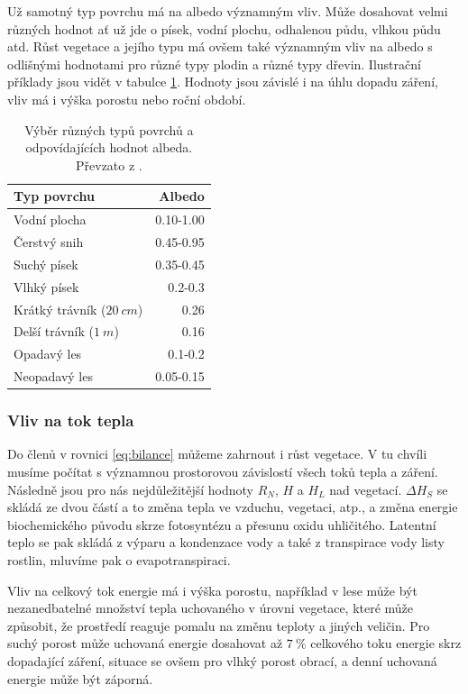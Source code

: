Už samotný typ povrchu má na albedo významným vliv. Může dosahovat velmi různých hodnot ať už jde o písek, vodní plochu, odhalenou půdu, vlhkou půdu atd. Růst vegetace a jejího typu má ovšem také významným vliv na albedo s odlišnými hodnotami pro různé typy plodin a různé typy dřevin. Ilustrační příklady jsou vidět v tabulce \ref{tab:albedo}. Hodnoty jsou závislé i na úhlu dopadu záření, vliv má i výška porostu nebo roční období\cite{arya2001,alma}.

\begin{table}
\centering\footnotesize\sf
\begin{tabular}{lr}
\toprule
Typ povrchu & Albedo \\
\midrule
Vodní plocha & 0.10-1.00 \\
Čerstvý snih & 0.45-0.95 \\
Suchý písek & 0.35-0.45\\
Vlhký písek & 0.2-0.3\\
Krátký trávník ($\SI{20}{cm}$) & 0.26\\
Delší trávník ($\SI{1}{m}$) & 0.16\\
Opadavý les & 0.1-0.2\\
Neopadavý les & 0.05-0.15\\
\bottomrule
\end{tabular}
	\caption{Výběr různých typů povrchů a odpovídajících hodnot albeda. Převzato z \cite{arya2001}.}
\label{tab:albedo}
\end{table}

\subsubsection{Vliv na tok tepla}
Do členů v rovnici \ref{eq:bilance} můžeme zahrnout i růst vegetace. V tu chvíli musíme počítat s významnou prostorovou závislostí všech toků tepla a záření. Následně jsou pro nás nejdůležitější hodnoty $R_N$, $H$ a $H_L$ nad vegetací. $\Delta H_S$ se skládá ze dvou částí a to změna tepla ve vzduchu, vegetaci, atp., a změna energie biochemického původu skrze fotosyntézu a přesunu oxidu uhličitého. Latentní teplo se pak skládá z výparu a kondenzace vody a také z transpirace vody listy rostlin, mluvíme pak o evapotranspiraci\cite{arya2001}. 

Vliv na celkový tok energie má i výška porostu, například v lese může být nezanedbatelné množství tepla uchovaného v úrovni vegetace, které může způsobit, že prostředí reaguje pomalu na změnu teploty a jiných veličin. Pro suchý porost může uchovaná energie dosahovat až $\SI{7}{\%}$ celkového toku energie skrz dopadající záření, situace se ovšem pro vlhký porost obrací, a denní uchovaná energie může být záporná\cite{alma}. 

